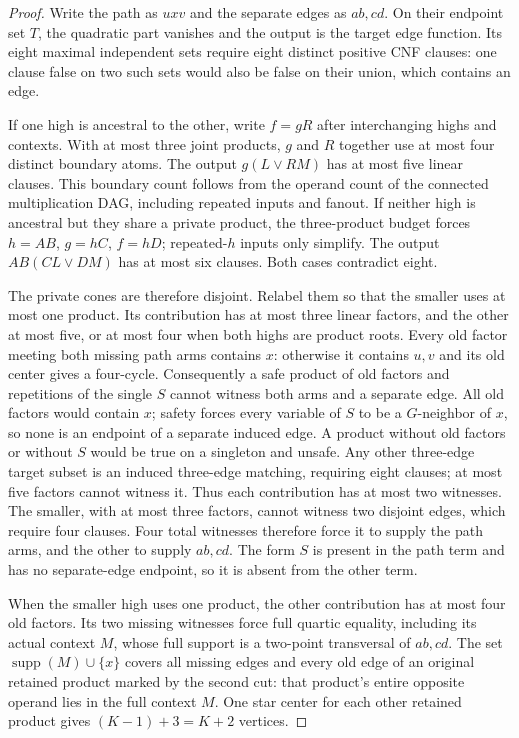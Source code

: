\documentclass[11pt]{article}
\newcommand{\supp}{\operatorname{supp}}
\theoremstyle{definition}
\theoremstyle{remark}
\begin{document}
\begin{proof}
Write the path as $uxv$ and the separate edges as $ab,cd$. On their endpoint set $T$, the quadratic part vanishes and the output is the target edge function. Its eight maximal independent sets require eight distinct positive CNF clauses: one clause false on two such sets would also be false on their union, which contains an edge.

If one high is ancestral to the other, write $f=gR$ after interchanging highs and contexts. With at most three joint products, $g$ and $R$ together use at most four distinct boundary atoms. The output $g(L\vee RM)$ has at most five linear clauses. This boundary count follows from the operand count of the connected multiplication DAG, including repeated inputs and fanout. If neither high is ancestral but they share a private product, the three-product budget forces $h=AB$, $g=hC$, $f=hD$; repeated-$h$ inputs only simplify. The output $AB(CL\vee DM)$ has at most six clauses. Both cases contradict eight.

The private cones are therefore disjoint. Relabel them so that the smaller uses at most one product. Its contribution has at most three linear factors, and the other at most five, or at most four when both highs are product roots. Every old factor meeting both missing path arms contains $x$: otherwise it contains $u,v$ and its old center gives a four-cycle. Consequently a safe product of old factors and repetitions of the single $S$ cannot witness both arms and a separate edge. All old factors would contain $x$; safety forces every variable of $S$ to be a $G$-neighbor of $x$, so none is an endpoint of a separate induced edge. A product without old factors or without $S$ would be true on a singleton and unsafe. Any other three-edge target subset is an induced three-edge matching, requiring eight clauses; at most five factors cannot witness it. Thus each contribution has at most two witnesses. The smaller, with at most three factors, cannot witness two disjoint edges, which require four clauses. Four total witnesses therefore force it to supply the path arms, and the other to supply $ab,cd$. The form $S$ is present in the path term and has no separate-edge endpoint, so it is absent from the other term.

When the smaller high uses one product, the other contribution has at most four old factors. Its two missing witnesses force full quartic equality, including its actual context $M$, whose full support is a two-point transversal of $ab,cd$. The set $\supp(M)\cup\{x\}$ covers all missing edges and every old edge of an original retained product marked by the second cut: that product's entire opposite operand lies in the full context $M$. One star center for each other retained product gives $(K-1)+3=K+2$ vertices.


\end{proof}
\end{document}
